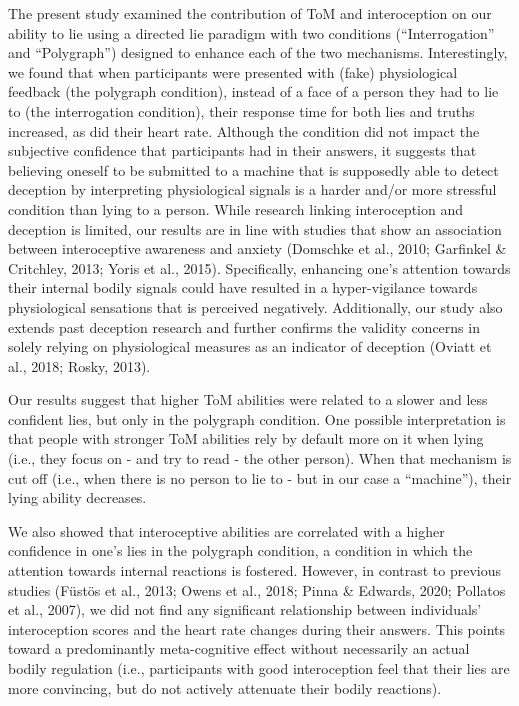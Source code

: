 \documentclass[
  man,floatsintext]{apa6}
\begin{document}
The present study examined the contribution of ToM and interoception on our ability to lie using a directed lie paradigm with two conditions (``Interrogation'' and ``Polygraph'') designed to enhance each of the two mechanisms. Interestingly, we found that when participants were presented with (fake) physiological feedback (the polygraph condition), instead of a face of a person they had to lie to (the interrogation condition), their response time for both lies and truths increased, as did their heart rate. Although the condition did not impact the subjective confidence that participants had in their answers, it suggests that believing oneself to be submitted to a machine that is supposedly able to detect deception by interpreting physiological signals is a harder and/or more stressful condition than lying to a person. While research linking interoception and deception is limited, our results are in line with studies that show an association between interoceptive awareness and anxiety (Domschke et al., 2010; Garfinkel \& Critchley, 2013; Yoris et al., 2015). Specifically, enhancing one's attention towards their internal bodily signals could have resulted in a hyper-vigilance towards physiological sensations that is perceived negatively. Additionally, our study also extends past deception research and further confirms the validity concerns in solely relying on physiological measures as an indicator of deception (Oviatt et al., 2018; Rosky, 2013).

Our results suggest that higher ToM abilities were related to a slower and less confident lies, but only in the polygraph condition. One possible interpretation is that people with stronger ToM abilities rely by default more on it when lying (i.e., they focus on - and try to read - the other person). When that mechanism is cut off (i.e., when there is no person to lie to - but in our case a ``machine''), their lying ability decreases.

We also showed that interoceptive abilities are correlated with a higher confidence in one's lies in the polygraph condition, a condition in which the attention towards internal reactions is fostered. However, in contrast to previous studies (Füstös et al., 2013; Owens et al., 2018; Pinna \& Edwards, 2020; Pollatos et al., 2007), we did not find any significant relationship between individuals' interoception scores and the heart rate changes during their answers. This points toward a predominantly meta-cognitive effect without necessarily an actual bodily regulation (i.e., participants with good interoception feel that their lies are more convincing, but do not actively attenuate their bodily reactions).
\end{document}
